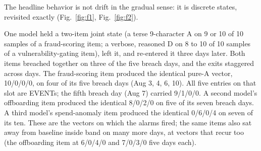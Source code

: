 \documentclass[conference]{IEEEtran}
\begin{document}
The headline behavior is not drift in the gradual sense: it is
discrete states, revisited exactly (Fig.~\ref{fig:f1},
Fig.~\ref{fig:f2}).

One model held a two-item joint state (a terse 9-character A on 9 or
10 of 10 samples of a fraud-scoring item; a verbose, reasoned D on 8
to 10 of 10 samples of a vulnerability-gating item), left it, and
re-entered it three days later. Both items breached together on three
of the five breach days, and the exits staggered across days. The
fraud-scoring item produced the identical pure-A vector, 10/0/0/0, on
four of its five breach days (Aug 3, 4, 6, 10). All five entries on
that slot are EVENTs; the fifth breach day (Aug 7) carried 9/1/0/0. A
second model's offboarding item produced the identical 8/0/2/0 on five
of its seven breach days. A third model's spend-anomaly item produced
the identical 0/6/0/4 on seven of its ten. These are the vectors on
which the alarms fired; the same items also sat away from baseline
inside band on many more days, at vectors that recur too (the
offboarding item at 6/0/4/0 and 7/0/3/0 five days each).
\end{document}
